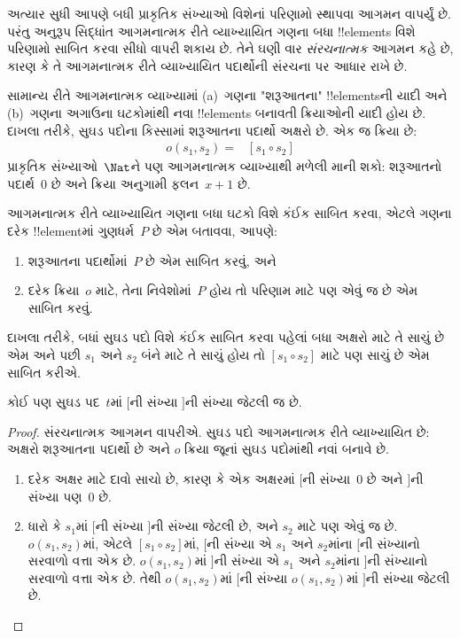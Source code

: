 \documentclass[../../../include/open-logic-section]{subfiles}
\begin{document}


અત્યાર સુધી આપણે બધી પ્રાકૃતિક સંખ્યાઓ વિશેનાં
પરિણામો સ્થાપવા આગમન વાપર્યું છે. પરંતુ અનુરૂપ
સિદ્ધાંત આગમનાત્મક રીતે વ્યાખ્યાયિત ગણના બધા
!!{element}s વિશે પરિણામો સાબિત કરવા સીધો વાપરી
શકાય છે. તેને ઘણી વાર \emph{સંરચનાત્મક} આગમન
કહે છે, કારણ કે તે આગમનાત્મક રીતે વ્યાખ્યાયિત
પદાર્થોની સંરચના પર આધાર રાખે છે.

સામાન્ય રીતે આગમનાત્મક વ્યાખ્યામાં (a)~ગણના
"શરૂઆતના" !!{element}sની યાદી અને (b)~ગણના
અગાઉના ઘટકોમાંથી નવા !!{element}s
બનાવતી ક્રિયાઓની યાદી હોય છે. દાખલા તરીકે,
સુઘડ પદોના કિસ્સામાં શરૂઆતના પદાર્થો અક્ષરો છે.
એક જ ક્રિયા છે:
\begin{align*}
  o(s_1, s_2) = & [s_1 \circ s_2]
\end{align*}
પ્રાકૃતિક સંખ્યાઓ~$\Nat$ને પણ આગમનાત્મક
વ્યાખ્યાથી મળેલી માની શકો: શરૂઆતનો પદાર્થ~$0$
છે અને ક્રિયા અનુગામી ફલન~$x + 1$ છે.

આગમનાત્મક રીતે વ્યાખ્યાયિત ગણના બધા ઘટકો
વિશે કંઈક સાબિત કરવા, એટલે ગણના દરેક
!!{element}માં ગુણધર્મ~$P$ છે એમ બતાવવા,
આપણે:
\begin{enumerate}
\item શરૂઆતના પદાર્થોમાં~$P$ છે એમ સાબિત કરવું, અને
\item દરેક ક્રિયા~$o$ માટે, તેના નિવેશોમાં~$P$
  હોય તો પરિણામ માટે પણ એવું જ છે એમ સાબિત કરવું.
\end{enumerate}
દાખલા તરીકે, બધાં સુઘડ પદો વિશે કંઈક સાબિત
કરવા પહેલાં બધા અક્ષરો માટે તે સાચું છે એમ
અને પછી $s_1$ અને $s_2$ બંને માટે તે સાચું
હોય તો $[s_1 \circ s_2]$ માટે પણ સાચું છે
એમ સાબિત કરીએ.

\begin{prop}
  કોઈ પણ સુઘડ પદ~$t$માં $[$ની સંખ્યા $]$ની
  સંખ્યા જેટલી જ છે.
\end{prop}

\begin{proof}
સંરચનાત્મક આગમન વાપરીએ. સુઘડ પદો આગમનાત્મક
રીતે વ્યાખ્યાયિત છે: અક્ષરો શરૂઆતના પદાર્થો છે
અને $o$ ક્રિયા જૂનાં સુઘડ પદોમાંથી નવાં બનાવે છે.
\begin{enumerate}
\item દરેક અક્ષર માટે દાવો સાચો છે, કારણ કે એક
  અક્ષરમાં $[$ની સંખ્યા~$0$ છે અને $]$ની
  સંખ્યા પણ~$0$ છે.
\item ધારો કે $s_1$માં $[$ની સંખ્યા $]$ની
  સંખ્યા જેટલી છે, અને $s_2$ માટે પણ એવું
  જ છે. $o(s_1, s_2)$માં, એટલે
  $[s_1 \circ s_2]$માં, $[$ની સંખ્યા એ
  $s_1$ અને $s_2$માંના $[$ની સંખ્યાનો
  સરવાળો વત્તા એક છે. $o(s_1, s_2)$માં
  $]$ની સંખ્યા એ $s_1$ અને $s_2$માંના
  $]$ની સંખ્યાનો સરવાળો વત્તા એક છે.
  તેથી $o(s_1, s_2)$માં $[$ની સંખ્યા
  $o(s_1,s_2)$માં $]$ની સંખ્યા જેટલી છે.
\end{enumerate}
\end{proof}
\end{document}
